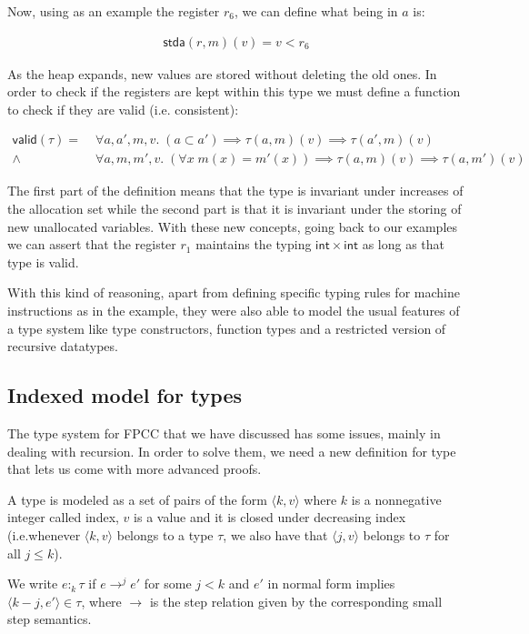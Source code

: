\documentclass{article}
\begin{document}
Now, using as an example the register $r_6$, we can 
define what being in $a$ is:

\begin{align*}
    \mathsf{stda}(r,m)(v)=v<r_6
\end{align*}

As the heap expands, new values are stored without 
deleting the old ones. In order to check if the 
registers are kept within this type we must define 
a function to check if they are valid (i.e. 
consistent):

\begin{align*}
  \mathsf{valid}(\tau)=
  &\;\forall a,a',m,v.\;(a \subset a') \implies 
    \tau(a,m)(v) \implies \tau(a',m)(v)\\
  \wedge&\;\forall a,m,m',v.\; (\forall x\;m(x)=m'(x))
    \implies \tau(a,m)(v) \implies \tau(a,m')(v)
\end{align*}

The first part of the definition means that the type 
is invariant under increases of the allocation set
while the second part is that it is invariant under 
the storing of new unallocated variables. With these
new concepts, going back to our examples we can
assert that the register $r_1$ maintains the typing 
$\mathsf{int}\times\mathsf{int}$ as long as that 
type is valid. 

With this kind of reasoning, apart from defining 
specific typing rules for machine instructions as in the 
example, they were also able to model the usual features 
of a type system like type constructors, function types 
and a restricted version of recursive datatypes.

\subsection*{Indexed model for types}

The type system for FPCC that we have discussed has 
some issues, mainly in dealing with recursion. 
In order to solve them, we need a new definition for
type that lets us come with more advanced proofs.

A type is modeled as a set of pairs of the form 
$\langle k, v \rangle$ where $k$ is a nonnegative integer called 
index, $v$ is a value and it is closed under decreasing index 
(i.e.whenever $\langle k, v \rangle$ belongs to a type $\tau$, 
we also have that $\langle j, v \rangle$ belongs to 
$\tau$ for all $j \leq k$).

We write $e :_k \tau$ if $e \rightarrow^j e'$ for some $j < k$ 
and $e'$ in normal form implies 
$\langle k - j, e'\rangle \in \tau$, where $\rightarrow$ 
is the step relation given by the corresponding small step 
semantics.
\end{document}
